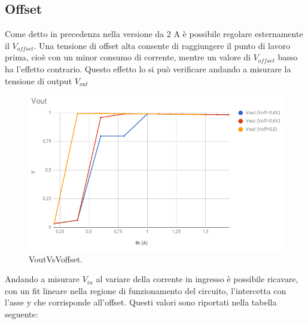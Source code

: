 \subsection{Offset}
Come detto in precedenza nella versione da 2 A è possibile regolare esternamente il $V_{offset}$. 
Una tensione di offset alta consente di raggiungere il punto di lavoro prima, cioè con un minor consumo di corrente, mentre un valore di $V_{offset}$ basso ha l'effetto contrario. Questo effetto lo si può verificare andando a misurare la tensione di output $V_{out}$
\begin{figure}
\centering
\includegraphics[scale=.4]{Immagini/VoutVsVoffset}
\caption{VoutVsVoffset.}
\label{VoutVsVoffset}
\end{figure}

Andando a misurare $V_{in}$ al variare della corrente in ingresso è possibile ricavare, con un fit lineare nella regione di funzionamento del circuito, l'intercetta con l'asse y che corrisponde all'offset. 
Questi valori sono riportati nella tabella seguente:

